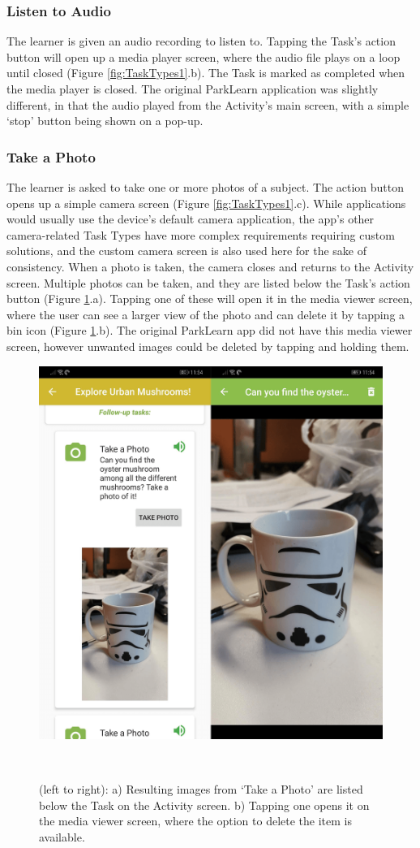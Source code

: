 \subsubsection*{Listen to Audio}
The learner is given an audio recording to listen to. Tapping the Task's action button will open up a media player screen, where the audio file plays on a loop until closed (Figure \ref{fig:TaskTypes1}.b). The Task is marked as completed when the media player is closed. The original ParkLearn application was slightly different, in that the audio played from the Activity's main screen, with a simple `stop' button being shown on a pop-up.
    
\subsubsection*{Take a Photo}
The learner is asked to take one or more photos of a subject. The action button opens up a simple camera screen (Figure \ref{fig:TaskTypes1}.c). While applications would usually use the device's default camera application, the app's other camera-related Task Types have more complex requirements requiring custom solutions, and the custom camera screen is also used here for the sake of consistency. When a photo is taken, the camera closes and returns to the Activity screen. Multiple photos can be taken, and they are listed below the Task's action button (Figure \ref{fig:MediaViewer}.a). Tapping one of these will open it in the media viewer screen, where the user can see a larger view of the photo and can delete it by tapping a bin icon (Figure \ref{fig:MediaViewer}.b). The original ParkLearn app did not have this media viewer screen, however unwanted images could be deleted by tapping and holding them.

\begin{figure}
  \centering
  \includegraphics[width=0.65\columnwidth]{images/chapter05/mediaViewer.png}
  \caption{(left to right): a) Resulting images from `Take a Photo' are listed below the Task on the Activity screen. b) Tapping one opens it on the media viewer screen, where the option to delete the item is available.}~\label{fig:MediaViewer}
\end{figure}

